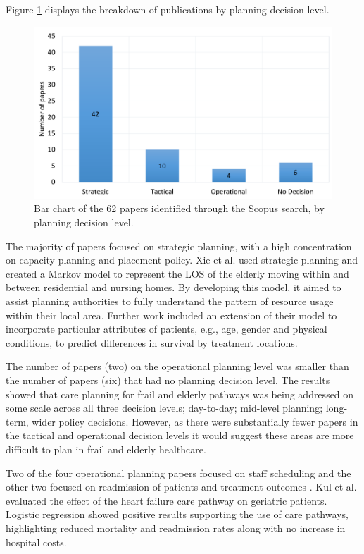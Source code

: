 \documentclass[../thesis.tex]{subfiles}
\begin{document}
Figure \ref{fig:PlanningDecision} displays the breakdown of publications by planning decision level.

\begin{figure}[H]
\centering
    \includegraphics[scale = 0.3]{Chapter2/Figures/Planning1.pdf}
   \caption{Bar chart of the 62 papers identified through the Scopus search, by planning decision level.} \label{fig:PlanningDecision}
\end{figure}

The majority of papers focused on strategic planning, with a high concentration on capacity planning and placement policy. Xie et al. \cite{Xie} used strategic planning and created a Markov model to represent the LOS of the elderly moving within and between residential and nursing homes. By developing this model, it aimed to assist planning authorities to fully understand the pattern of resource usage within their local area. Further work included an extension of their model to incorporate particular attributes of patients, e.g., age, gender and physical conditions, to predict differences in survival by treatment locations.

The number of papers (two) on the operational planning level was smaller than the number of papers (six) that had no planning decision level. The results showed that care planning for frail and elderly pathways was being addressed on some scale across all three decision levels; day-to-day; mid-level planning; long-term, wider policy decisions. However, as there were substantially fewer papers in the tactical and operational decision levels it would suggest these areas are more difficult to plan in frail and elderly healthcare.

Two of the four operational planning papers focused on staff scheduling \cite{Eveborn,Grenouilleau} and the other two focused on readmission of patients \cite{Gordon1} and treatment outcomes \cite{Kul}. Kul et al. \cite{Kul} evaluated the effect of the heart failure care pathway on geriatric patients. Logistic regression showed positive results supporting the use of care pathways, highlighting reduced mortality and readmission rates along with no increase in hospital costs.
\end{document}
